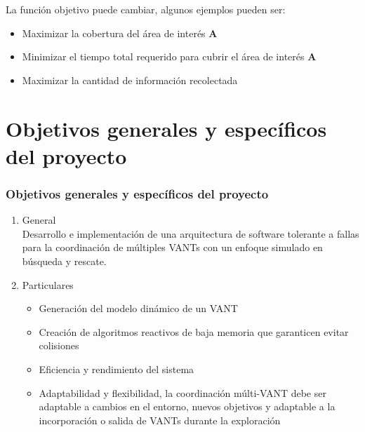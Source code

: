 \documentclass[
	11pt, %
]{beamer}
\begin{document}
\begin{frame}
  La función objetivo puede cambiar, algunos ejemplos pueden ser:
  \bigskip %
  \begin{itemize}
  \item Maximizar la cobertura del área de interés \textbf{A}
  \item Minimizar el tiempo total requerido para cubrir el área de interés \textbf{A}
  \item Maximizar la cantidad de información recolectada
  \end{itemize}
  
\end{frame}

\section{Objetivos generales y específicos del proyecto}

\begin{frame}
  
  \frametitle{Objetivos generales y específicos del proyecto}

  \begin{enumerate}
  \item<1-> General \\

    Desarrollo e implementación de una arquitectura de software tolerante a fallas para la coordinación de múltiples VANTs con un enfoque simulado en búsqueda y rescate.
        
  \item<2-> Particulares\\

    \begin{itemize}
    \item<1-> Generación del modelo dinámico de un VANT 
    \item<2-> Creación de algoritmos reactivos de baja memoria que garanticen evitar colisiones
    \item<3-> Eficiencia y rendimiento del sistema
    \item<4-> Adaptabilidad y flexibilidad, la coordinación múlti-VANT debe ser adaptable a cambios en el entorno, nuevos objetivos y adaptable a la incorporación o salida de VANTs durante la exploración
    \end{itemize}
    
  \end{enumerate}
\end{frame}
\end{document}
